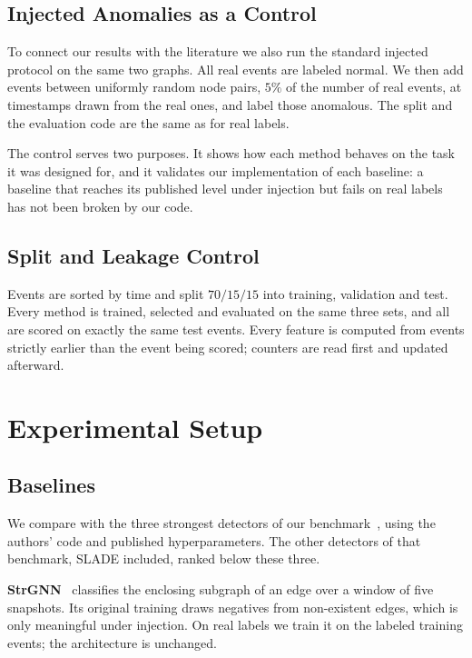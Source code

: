 \documentclass[pdflatex,sn-basic]{sn-jnl}
\theoremstyle{definition}
\theoremstyle{plain}
\begin{document}
\subsection{Injected Anomalies as a Control}
To connect our results with the literature we also run the standard injected
protocol on the same two graphs. All real events are labeled normal. We then
add events between uniformly random node pairs, $5\%$ of the number of real
events, at timestamps drawn from the real ones, and label those anomalous. The
split and the evaluation code are the same as for real labels.

The control serves two purposes. It shows how each method behaves on the task
it was designed for, and it validates our implementation of each baseline: a
baseline that reaches its published level under injection but fails on real
labels has not been broken by our code.

\subsection{Split and Leakage Control}
Events are sorted by time and split $70/15/15$ into training, validation and
test. Every method is trained, selected and evaluated on the same three sets,
and all are scored on exactly the same test events. Every feature is computed
from events strictly earlier than the event being scored; counters are read
first and updated afterward.

\section{Experimental Setup}
\label{sec:setup}

\subsection{Baselines}
We compare with the three strongest detectors of our
benchmark~\cite{nekka_survey}, using the authors' code and published
hyperparameters. The other detectors of that benchmark, SLADE included, ranked
below these three.

\textbf{StrGNN}~\cite{strgnn} classifies the enclosing subgraph of an edge over
a window of five snapshots. Its original training draws negatives from
non-existent edges, which is only meaningful under injection. On real labels
we train it on the labeled training events; the architecture is unchanged.
\end{document}
